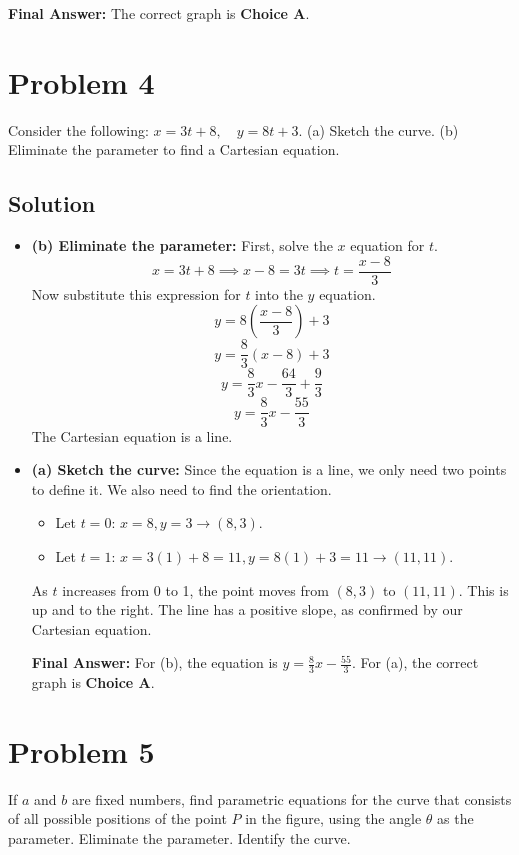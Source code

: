 \documentclass{article}
\begin{document}
\textbf{Final Answer:} The correct graph is \textbf{Choice A}.

\section{Problem 4}
Consider the following: $x = 3t + 8, \quad y = 8t + 3$.
(a) Sketch the curve.
(b) Eliminate the parameter to find a Cartesian equation.

\subsection*{Solution}
\begin{itemize}
    \item \textbf{(b) Eliminate the parameter:}
    First, solve the $x$ equation for $t$.
    \[ x = 3t + 8 \implies x - 8 = 3t \implies t = \frac{x-8}{3} \]
    Now substitute this expression for $t$ into the $y$ equation.
    \[ y = 8\left(\frac{x-8}{3}\right) + 3 \]
    \[ y = \frac{8}{3}(x-8) + 3 \]
    \[ y = \frac{8}{3}x - \frac{64}{3} + \frac{9}{3} \]
    \[ y = \frac{8}{3}x - \frac{55}{3} \]
    The Cartesian equation is a line.

    \item \textbf{(a) Sketch the curve:}
    Since the equation is a line, we only need two points to define it. We also need to find the orientation.
    \begin{itemize}
        \item Let $t=0$: $x=8, y=3 \rightarrow (8, 3)$.
        \item Let $t=1$: $x=3(1)+8=11, y=8(1)+3=11 \rightarrow (11, 11)$.
    \end{itemize}
    As $t$ increases from 0 to 1, the point moves from $(8, 3)$ to $(11, 11)$. This is up and to the right. The line has a positive slope, as confirmed by our Cartesian equation.

    \textbf{Final Answer:} For (b), the equation is $y = \frac{8}{3}x - \frac{55}{3}$. For (a), the correct graph is \textbf{Choice A}.
\end{itemize}

\section{Problem 5}
If $a$ and $b$ are fixed numbers, find parametric equations for the curve that consists of all possible positions of the point $P$ in the figure, using the angle $\theta$ as the parameter. Eliminate the parameter. Identify the curve.
\end{document}
